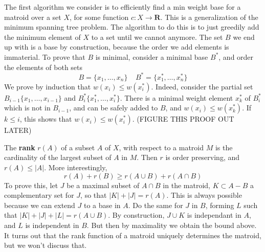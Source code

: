 The first algorithm we consider is to efficiently find a min weight base for a matroid over a set $X$, for some function $c: X \to \mathbf{R}$. This is a generalization of the minimum spanning tree problem. The algorithm to do this is to just greedily add the minimum element of $X$ to a set until we cannot anymore. The set $B$ we end up with is a base by construction, because the order we add elements is immaterial. To prove that $B$ is minimal, consider a minimal base $B^*$, and order the elements of both sets
%
\[ B = \{ x_1, \dots, x_n \}\ \ \ \ \ B^* = \{ x_1^*, \dots, x_n^* \} \]
%
We prove by induction that $w(x_i) \leq w(x_i^*)$. Indeed, consider the partial set $B_{i-1} \{ x_1, \dots, x_{i-1} \}$ and $B_i^* \{ x_1^*, \dots, x_i^* \}$. There is a minimal weight element $x_k^*$ of $B_i^*$ which is not in $B_{i-1}$, and can be safely added to $B$, and $w(x_i) \leq w(x_k^*)$. If $k \leq i$, this shows that $w(x_i) \leq w(x_i^*)$. (FIGURE THIS PROOF OUT LATER)

The {\bf rank} $r(A)$ of a subset $A$ of $X$, with respect to a matroid $M$ is the cardinality of the largest subset of $A$ in $M$. Then $r$ is order preserving, and $r(A) \leq |A|$. More interestingly,
%
\[ r(A) + r(B) \geq r(A \cup B) + r(A \cap B) \]
%
To prove this, let $J$ be a maximal subset of $A \cap B$ in the matroid, $K \subset A - B$ a complementary set for $J$, so that $|K| + |J| = r(A)$. This is always possible because we can extend $J$ to a base in $A$. Do the same for $J$ in $B$, forming $L$ such that $|K| + |J| + |L| = r(A \cup B)$. By construction, $J \cup K$ is independant in $A$, and $L$ is independent in $B$. But then by maximality we obtain the bound above. It turns out that the rank function of a matroid uniquely determines the matroid, but we won't discuss that.

